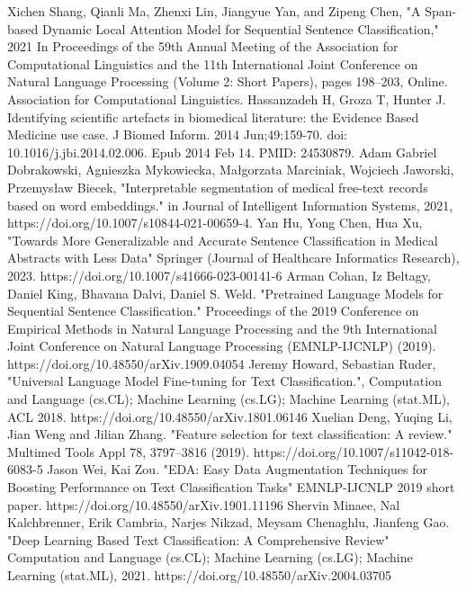 \documentclass[12pt,a4paper]{report}     %
\begin{document}
\begin{normalsize}
{{\begin{thebibliography}{9}
 Xichen Shang, Qianli Ma, Zhenxi Lin, Jiangyue Yan, and Zipeng Chen, "A Span-based Dynamic Local Attention Model for Sequential Sentence Classification," 2021 In Proceedings of the 59th Annual Meeting of the Association for Computational Linguistics and the 11th International Joint Conference on Natural Language Processing (Volume 2: Short Papers), pages 198–203, Online. Association for Computational Linguistics.
 Hassanzadeh H, Groza T, Hunter J. Identifying scientific artefacts in biomedical literature: the Evidence Based Medicine use case. J Biomed Inform. 2014 Jun;49:159-70. doi: 10.1016/j.jbi.2014.02.006. Epub 2014 Feb 14. PMID: 24530879.
 Adam Gabriel Dobrakowski, Agnieszka Mykowiecka, Małgorzata Marciniak, Wojciech Jaworski, Przemysław Biecek, "Interpretable segmentation of medical free-text records based on word embeddings." in Journal of Intelligent Information Systems, 2021, 
https://doi.org/10.1007/s10844-021-00659-4.
 Yan Hu, Yong Chen, Hua Xu, "Towards More Generalizable and Accurate Sentence Classification in Medical Abstracts with Less Data" Springer (Journal of Healthcare Informatics Research), 2023. 
https://doi.org/10.1007/s41666-023-00141-6
 Arman Cohan, Iz Beltagy, Daniel King, Bhavana Dalvi, Daniel S. Weld. "Pretrained Language Models for Sequential Sentence Classification." Proceedings of the 2019 Conference on Empirical Methods in Natural Language Processing and the 9th International Joint Conference on Natural Language Processing (EMNLP-IJCNLP) (2019). https://doi.org/10.48550/arXiv.1909.04054
 Jeremy Howard, Sebastian Ruder, "Universal Language Model Fine-tuning for Text Classification.", Computation and Language (cs.CL); Machine Learning (cs.LG); Machine Learning (stat.ML), ACL 2018.
https://doi.org/10.48550/arXiv.1801.06146
 Xuelian Deng, Yuqing Li, Jian Weng and Jilian Zhang. "Feature selection for text classification: A review." Multimed Tools Appl 78, 3797–3816 (2019).
https://doi.org/10.1007/s11042-018-6083-5
 Jason Wei, Kai Zou. "EDA: Easy Data Augmentation Techniques for Boosting Performance on Text Classification Tasks" EMNLP-IJCNLP 2019 short paper. https://doi.org/10.48550/arXiv.1901.11196
 Shervin Minaee, Nal Kalchbrenner, Erik Cambria, Narjes Nikzad, Meysam Chenaghlu, Jianfeng Gao. "Deep Learning Based Text Classification: A Comprehensive Review" Computation and Language (cs.CL); Machine Learning (cs.LG); Machine Learning (stat.ML), 2021. 
https://doi.org/10.48550/arXiv.2004.03705
\end{thebibliography}
\par}
}


\end{normalsize}
\end{document}
